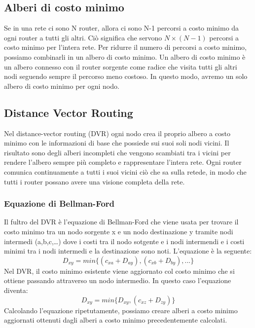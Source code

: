 \documentclass[12pt]{report}
\begin{document}
\subsection{Alberi di costo minimo}
Se in una rete ci sono N router, allora ci sono N-1 percorsi a costo minimo da ogni router a tutti gli altri. Ciò significa che servono $N \times (N-1)$ percorsi a costo minimo per l'intera rete. Per ridurre il numero di percorsi a costo minimo, possiamo combinarli in un albero di costo minimo. Un albero di costo minimo è un albero connesso con il router sorgente come radice che visita tutti gli altri nodi seguendo sempre il percorso meno costoso. In questo modo, avremo un solo albero di costo minimo per ogni nodo.

\subsection{Distance Vector Routing}
Nel distance-vector routing (DVR) ogni nodo crea il proprio albero a costo minimo con le informazioni di base che possiede sui suoi soli nodi vicini. Il risultato sono degli alberi incompleti che vengono scambiati tra i vicini per rendere l'albero sempre più completo e rappresentare l'intera rete. Ogni router comunica continuamente a tutti i suoi vicini ciò che sa sulla retede, in modo che tutti i router possano avere una visione completa della rete. 
\subsubsection{Equazione di Bellman-Ford}
Il fultro del DVR è l'equazione di Bellman-Ford che viene usata per trovare il costo minimo tra un nodo sorgente x e un nodo destinazione y tramite nodi intermedi (a,b,c,\ldots) dove i costi tra il nodo sotgente e i nodi intermendi e i costi minimi tra i nodi intermedi e la destinazione sono noti. L'equazione è la seguente:
\[
	D_{xy} = min\{ (c_{xa} + D_{ay}), (c_{xb} + D_{by}), ... \}
\]
Nel DVR, il costo minimo esistente viene aggiornato col costo minimo che si ottiene passando attraverso un nodo intermedio. In questo caso l'equazione diventa:
\[
	D_{xy} = min\{ D_{xy}, (c_{xz} + D_{zy}) \}
\]
Calcolando l'equazione ripetutamente, possiamo creare alberi a costo minimo aggiornati ottenuti dagli alberi a costo minimo precedentemente calcolati.
\end{document}
